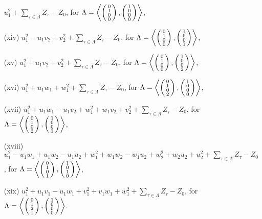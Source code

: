 \begin{prop}
\begin{itemize}
$u_1^2+\sum_{\tau\in \Lambda} Z_\tau-Z_0$, for  $\Lambda = \plan{0\\1\\0\\0}{1\\0\\0\\0}$,
\item[(xiv)]
$u_1^2-u_1v_2+v_2^2+ \sum_{\tau\in \Lambda} Z_\tau-Z_0$, for  $\Lambda = \plan{0\\1\\0\\0}{1\\0\\0\\1}$,
\item[(xv)]
$u_1^2+u_1v_2+v_2^2+\sum_{\tau\in \Lambda} Z_\tau-Z_0$, for $\Lambda= \plan{0\\1\\0\\0}{1\\0\\0\\2}$,
\item[(xvi)]
$u_1^2+u_1w_1+w_1^2+\sum_{\tau\in \Lambda} Z_\tau-Z_0$, for $\Lambda = \plan{0\\1\\0\\2}{1\\0\\0\\0}$,
\item[(xvii)]
$u_1^2+u_1w_1-u_1v_2+w_1^2+w_1v_2+v_2^2+\sum_{\tau\in \Lambda} Z_\tau-Z_0$, for $\Lambda = \plan{0\\1\\0\\2}{1\\0\\0\\1}$,
\item[(xviii)]
$u_1^2-u_1w_1+u_1w_2-u_1u_2+w_1^2+w_1w_2-w_1u_2+w_2^2+w_2u_2+u_2^2+\sum_{\tau\in \Lambda} Z_\tau-Z_0$, for  $\Lambda = \plan{0\\1\\0\\1}{1\\0\\1\\0}$,
\item[(xix)]
$u_1^2+u_1v_1-u_1w_1+v_1^2+v_1w_1+w_1^2+\sum_{\tau\in \Lambda} Z_\tau-Z_0$, for $\Lambda = \plan{0\\1\\2\\1}{1\\0\\0\\0}$.
\end{itemize}
\end{prop}
